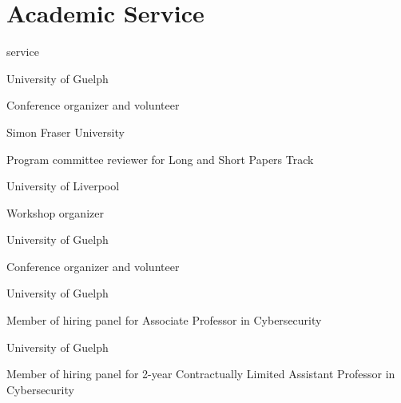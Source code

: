 \section{Academic Service}
\begin{revlist}{service}
\item {}
  University of Guelph
  \begin{cvbullets}\item Conference organizer and volunteer\end{cvbullets}
\item {}
  Simon Fraser University
  \begin{cvbullets}\item Program committee reviewer for Long and Short Papers Track\end{cvbullets}
\item {}
  University of Liverpool
  \begin{cvbullets}\item Workshop organizer\end{cvbullets}
\item {}
  University of Guelph
  \begin{cvbullets}\item Conference organizer and volunteer\end{cvbullets}
\item {}
  University of Guelph
  \begin{cvbullets}\item Member of hiring panel for Associate Professor in Cybersecurity\end{cvbullets}
\item {}
  University of Guelph
  \begin{cvbullets}\item Member of hiring panel for 2-year Contractually Limited Assistant Professor in Cybersecurity\end{cvbullets}
\end{revlist}


